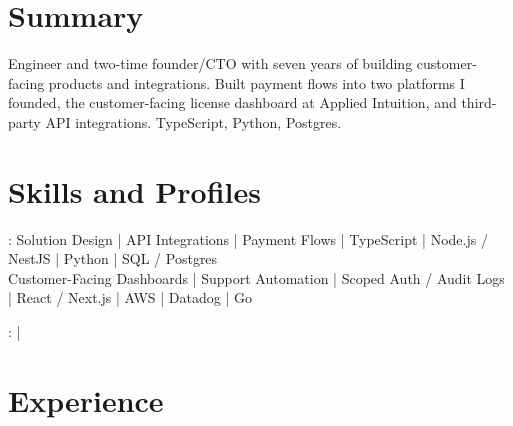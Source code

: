 \documentclass[print]{jack-resume}
\begin{document}
\pagecolor{darkmodeBackground}


\begin{minipage}[t][1cm][t]{.03\textwidth}
    \hfill
\end{minipage}

\section{Summary}
Engineer and two-time founder/CTO with seven years of building customer-facing products and integrations. Built payment flows into two platforms I founded, the customer-facing license dashboard at Applied Intuition, and third-party API integrations. TypeScript, Python, Postgres.
\sectionsep

\section{Skills and Profiles}
:
Solution Design \hfill | \hfill
API Integrations \hfill | \hfill
Payment Flows \hfill | \hfill
TypeScript \hfill | \hfill
Node.js / NestJS \hfill | \hfill
Python \hfill | \hfill
SQL / Postgres \\
\hspace{1.0cm} Customer-Facing Dashboards \hfill | \hfill
Support Automation \hfill | \hfill
Scoped Auth / Audit Logs \hfill | \hfill
React / Next.js \hfill | \hfill
AWS \hfill | \hfill
Datadog \hfill | \hfill
Go \\

\raggedright{
    :
      \href{https://www.linkedin.com/in/jack-sturtevant/}{ \ExternalLink} |
     \href{https://github.com/jacksturt}{ \ExternalLink}}

\section{Experience}
\end{document}
